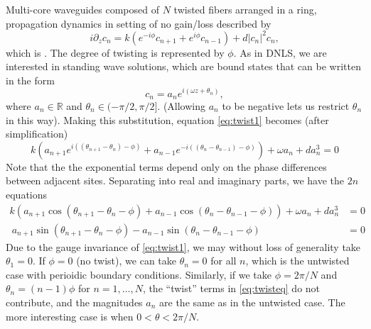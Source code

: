 \documentclass[12pt]{article}
\def\R{{\mathbb R}}
\begin{document}
Multi-core waveguides composed of $N$ twisted fibers arranged in a ring, propagation dynamics in setting of no gain/loss described by 
\begin{equation}\label{eq:twist1}
i \partial_z c_n = k \left(e^{-i\phi}c_{n+1} + e^{i\phi}c_{n-1}\right) + d |c_n|^2 c_n,
\end{equation}
which is \cite[(2.1)]{castro2016}. The degree of twisting is represented by $\phi$. As in DNLS, we are interested in standing wave solutions, which are bound states that can be written in the form
\begin{equation}\label{eq:ansatz1}
c_n = a_n e^{i (\omega z + \theta_n) },
\end{equation}
where $a_n \in \R$ and $\theta_n \in (-\pi/2, \pi/2]$. (Allowing $a_n$ to be negative lets us restrict $\theta_n$ in this way). Making this substitution, equation \cref{eq:twist1} becomes (after simplification)
\begin{equation}\label{eq:twisteq}
k\left( a_{n+1} e^{i((\theta_{n+1}-\theta_n)-\phi)} + a_{n-1} e^{-i((\theta_n - \theta_{n-1})-\phi)}\right) + \omega a_n + d a_n^3 = 0
\end{equation}
Note that the the exponential terms depend only on the phase differences between adjacent sites. Separating into real and imaginary parts, we have the $2n$ equations
\begin{equation}\label{eq:twisteqreal}
\begin{aligned}
k\left( a_{n+1} \cos(\theta_{n+1}-\theta_n-\phi) + a_{n-1} \cos(\theta_n - \theta_{n-1}-\phi)\right) + \omega a_n + d a_n^3 &= 0 \\\
a_{n+1} \sin(\theta_{n+1}-\theta_n-\phi) - a_{n-1} \sin(\theta_n - \theta_{n-1}-\phi) &= 0
\end{aligned}
\end{equation}
Due to the gauge invariance of \cref{eq:twist1}, we may without loss of generality take $\theta_1 = 0$. If $\phi = 0$ (no twist), we can take $\theta_n = 0$ for all $n$, which is the untwisted case with perioidic boundary conditions. Similarly, if we take $\phi = 2 \pi/N$ and $\theta_n = (n-1)\phi$ for $n = 1, \dots, N$, the ``twist'' terms in \cref{eq:twisteq} do not contribute, and the magnitudes $a_n$ are the same as in the untwisted case. The more interesting case is when $0 < \theta < 2 \pi/N$.
\end{document}
